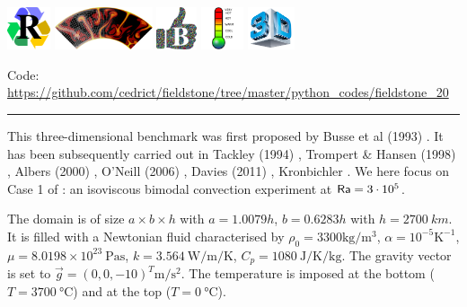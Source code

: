 
\includegraphics[height=1.25cm]{images/pictograms/replication}
\includegraphics[height=1.25cm]{images/pictograms/aspect_logo}
\includegraphics[height=1.25cm]{images/pictograms/benchmark}
\includegraphics[height=1.25cm]{images/pictograms/temperature}
\includegraphics[height=1.25cm]{images/pictograms/3d}



\begin{center}
\inpython
{\small Code: \url{https://github.com/cedrict/fieldstone/tree/master/python_codes/fieldstone_20}}
\end{center}

\par\noindent\rule{\textwidth}{0.4pt}

This three-dimensional benchmark was first proposed by Busse et al (1993) \cite{bucc94}. 
It has been subsequently carried out in Tackley (1994) \cite{tack94},
Trompert \& Hansen (1998) \cite{trha98}, Albers (2000) \cite{albe00},
O'Neill \etal (2006) \cite{onmm06}, Davies \etal (2011) \cite{dawk11}, Kronbichler \etal \cite{krhb12}.
We here focus on Case 1 of \cite{bucc94}:  an isoviscous bimodal convection experiment at ${\mathsf{Ra}}=3\cdot 10^5$.

The domain is of size $a\times b\times h$ with $a=1.0079h$, $b=0.6283h$ 
with $h=\SI{2700}{km}$. It is filled with a Newtonian fluid 
characterised by $\rho_0=3300\si{\kg\per\cubic\meter}$, $\alpha=10^{-5}\si{\kelvin}^{-1}$, 
$\mu=8.0198\times10^{23}~\si{\pascal\second}$, 
$k=3.564~\si{\watt\per\meter\per\kelvin}$, 
$C_p=1080~\si{\joule\per\kelvin\per\kg}$.
The gravity vector is set to $\vec{g}=(0,0,-10)^T\si{\meter\per\square\second}$.
The temperature is imposed at the bottom  ($T=3700~\si{\celsius}$) and at the top ($T=0~\si{\celsius}$).

